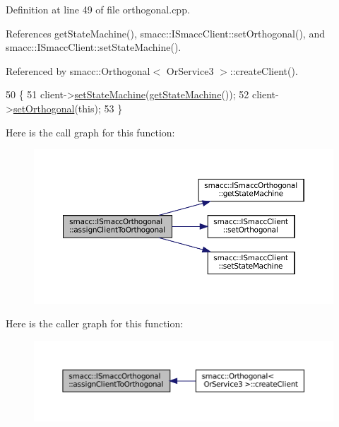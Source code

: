 Definition at line 49 of file orthogonal.\+cpp.



References get\+State\+Machine(), smacc\+::\+I\+Smacc\+Client\+::set\+Orthogonal(), and smacc\+::\+I\+Smacc\+Client\+::set\+State\+Machine().



Referenced by smacc\+::\+Orthogonal$<$ Or\+Service3 $>$\+::create\+Client().


\begin{DoxyCode}
50   \{
51     client->\hyperlink{classsmacc_1_1ISmaccClient_a28fd6ca2bcf9c5e57f3cc16fb0a076d3}{setStateMachine}(\hyperlink{classsmacc_1_1ISmaccOrthogonal_aae265ec480b8ed552ddc79afd2d93a62}{getStateMachine}());
52     client->\hyperlink{classsmacc_1_1ISmaccClient_a40330788a976dc08e2f726d210564ec4}{setOrthogonal}(\textcolor{keyword}{this});
53   \}
\end{DoxyCode}
Here is the call graph for this function\+:
\nopagebreak
\begin{figure}[H]
\begin{center}
\leavevmode
\includegraphics[width=350pt]{classsmacc_1_1ISmaccOrthogonal_a586a3b5cabae55f2bf1434cd90c1bdfa_cgraph}
\end{center}
\end{figure}
Here is the caller graph for this function\+:
\nopagebreak
\begin{figure}[H]
\begin{center}
\leavevmode
\includegraphics[width=350pt]{classsmacc_1_1ISmaccOrthogonal_a586a3b5cabae55f2bf1434cd90c1bdfa_icgraph}
\end{center}
\end{figure}
\mbox{\label{classsmacc_1_1ISmaccOrthogonal_a463bb235217511954feb4133394c4c61}} 
